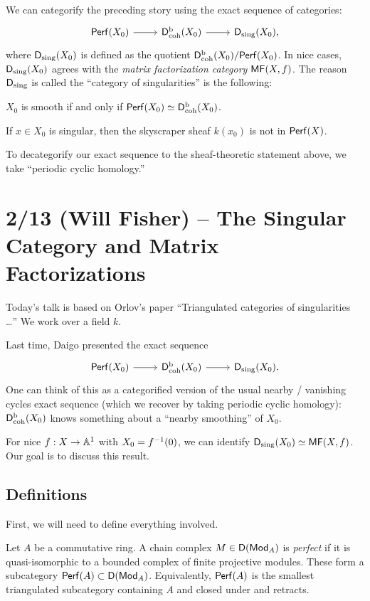 \documentclass{article}
\begin{document}
We can categorify the preceding story using the exact sequence of categories:
\[
	\begin{tikzcd}
		\Perf(X_0) \rar & \Dbcoh(X_0) \rar & \Dsing(X_0),
	\end{tikzcd}
\]
where $\Dsing(X_0)$ is defined as the quotient $\Dbcoh(X_0) / \Perf(X_0)$.
In nice cases, $\Dsing(X_0)$ agrees with the \emph{matrix factorization category} $\MF(X, f)$.
The reason $\Dsing$ is called the ``category of singularities'' is the following:

\begin{prop}
	$X_0$ is smooth if and only if $\Perf(X_0) \simeq \Dbcoh(X_0)$.
\end{prop}

\begin{ex}
	If $x \in X_0$ is singular, then the skyscraper sheaf $k(x_0)$ is not in $\Perf(X)$.
\end{ex}

To decategorify our exact sequence to the sheaf-theoretic statement above, we take ``periodic cyclic homology.''

\section{2/13 (Will Fisher) -- The Singular Category and Matrix Factorizations}

Today's talk is based on Orlov's paper ``Triangulated categories of singularities \dots''
We work over a field $k$.

Last time, Daigo presented the exact sequence
\[
	\begin{tikzcd}
		\Perf(X_0) \rar & \Dbcoh(X_0) \rar & \Dsing(X_0).
	\end{tikzcd}
\]
One can think of this as a categorified version of the usual nearby / vanishing cycles exact sequence (which we recover by taking periodic cyclic homology): $\Dbcoh(X_0)$ knows something about a ``nearby smoothing'' of $X_0$.

For nice $f: X \to \AA^1$ with $X_0 = f\inv(0)$, we can identify $\Dsing(X_0) \simeq \MF(X, f)$.
Our goal is to discuss this result.

\subsection{Definitions}

First, we will need to define everything involved.

\begin{dfn}
	Let $A$ be a commutative ring.
	A chain complex $M \in \Dsf(\Mod_A)$ is \emph{perfect} if it is quasi-isomorphic to a bounded complex of finite projective modules.
	These form a subcategory $\Perf(A) \subset \Dsf(\Mod_A)$.
	Equivalently, $\Perf(A)$ is the smallest triangulated subcategory containing $A$ and closed under and retracts.
\end{dfn}
\end{document}
